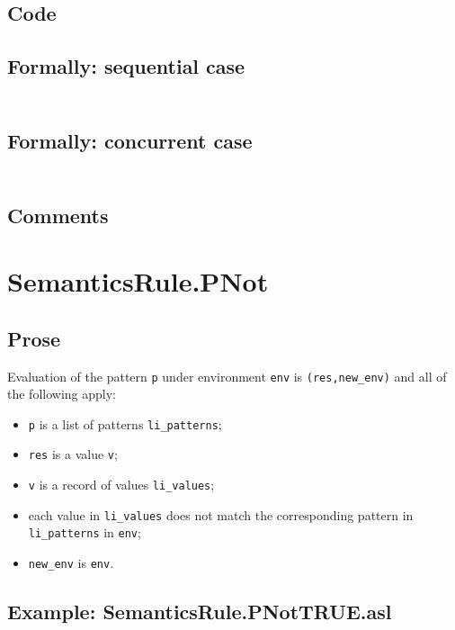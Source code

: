 \documentclass{book}
\begin{document}
  \subsection{Code}

  \subsection{Formally: sequential case}
  \begin{align}
  \end{align} 

  \subsection{Formally: concurrent case}
  \begin{align}
  \end{align} 

    \subsection{Comments}

\section{SemanticsRule.PNot \label{sec:SemanticsRule.PNot}}

    \subsection{Prose}
   Evaluation of the pattern \texttt{p} under environment \texttt{env} is
  \texttt{(res,new\_env)} and all of the following apply:
    \begin{itemize}
    \item \texttt{p} is a list of patterns \texttt{li\_patterns};
    \item \texttt{res} is a value \texttt{v};
    \item \texttt{v} is a record of values \texttt{li\_values};
    \item each value in \texttt{li\_values} does not match the corresponding pattern in \texttt{li\_patterns} in \texttt{env};
    \item \texttt{new\_env} is \texttt{env}.
    \end{itemize}
 
    \subsection{Example: SemanticsRule.PNotTRUE.asl}
\end{document}
